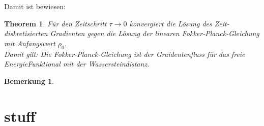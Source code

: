 \documentclass[11pt,a4paper,notitlepage]{scrreprt}
\newtheorem{theorem}[defi]{Theorem}
\newtheorem{bem}[defi]{Bemerkung}
\begin{document}
Damit ist bewiesen:
\begin{theorem}
Für den Zeitschritt $\tau\to 0$ konvergiert die Lösung des Zeit-diskretisierten Gradienten gegen die Lösung der linearen Fokker-Planck-Gleichung mit Anfangswert $\rho_0$.\\
Damit gilt: Die Fokker-Planck-Gleichung ist der Graidentenfluss für das freie EnergieFunktional mit der Wassersteindistanz.
\end{theorem}

\begin{bem}
\end{bem}

\section{stuff}
\end{document}
